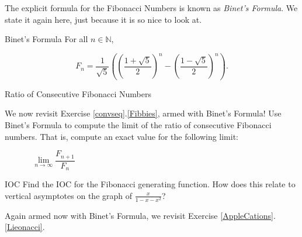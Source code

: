 The explicit formula for the Fibonacci Numbers is known as \emph{Binet's Formula}.  We state it again here, just because it is so nice to look at.

\begin{theorem}{Binet's Formula} For all $n\in \mathbb{N}$,

$$F_n = \frac{1}{\sqrt{5}} \left( \left(\frac{1+\sqrt{5}}{2}\right)^n-\left(\frac{1-\sqrt{5}}{2}\right)^n \right).   $$

\end{theorem}
\begin{exercise}{Ratio of Consecutive Fibonacci Numbers  \Coffeecup \Coffeecup}

We now revisit Exercise \ref{convseq}.\ref{Fibbies}, armed with Binet's Formula!  Use Binet's Formula to compute the limit of the ratio of consecutive Fibonacci numbers.  That is, compute an exact value for the following limit:

$$\lim_{n\rightarrow \infty}\frac{F_{n+1}}{F_n} \hspace{4in}$$
\vspace*{2in} 
\end{exercise}

\begin{exercise}{IOC \Coffeecup \Coffeecup}
Find the IOC for the Fibonacci generating function.  How does this relate to vertical asymptotes on the graph of $\frac{x}{1-x-x^2}$?
\vspace*{2in} 
\end{exercise}
Again armed now with Binet's Formula, we revisit Exercise \ref{AppleCations}.\ref{Lieonacci}.

